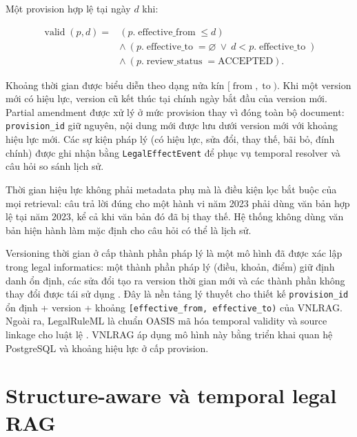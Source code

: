 \documentclass[a4paper,12pt]{extreport}
\newcommand{\code}[1]{\texttt{#1}}
\begin{document}
Một provision hợp lệ tại ngày $d$ khi:

\begin{equation}
\begin{aligned}
\operatorname{valid}(p,d)=
&\left(p.\operatorname{effective\_from}\le d\right)\\
&\land\ \left(p.\operatorname{effective\_to}=\varnothing\ \lor\ d<p.\operatorname{effective\_to}\right)\\
&\land\ \left(p.\operatorname{review\_status}=\text{ACCEPTED}\right).
\end{aligned}
\end{equation}

Khoảng thời gian được biểu diễn theo dạng nửa kín $[\operatorname{from},\operatorname{to})$. Khi một version mới có hiệu lực, version cũ kết thúc tại chính ngày bắt đầu của version mới. Partial amendment được xử lý ở mức provision thay vì đóng toàn bộ document: \code{provision\_id} giữ nguyên, nội dung mới được lưu dưới version mới với khoảng hiệu lực mới. Các sự kiện pháp lý (có hiệu lực, sửa đổi, thay thế, bãi bỏ, đính chính) được ghi nhận bằng \code{LegalEffectEvent} để phục vụ temporal resolver và câu hỏi so sánh lịch sử.

Thời gian hiệu lực không phải metadata phụ mà là điều kiện lọc bắt buộc của mọi retrieval: câu trả lời đúng cho một hành vi năm 2023 phải dùng văn bản hợp lệ tại năm 2023, kể cả khi văn bản đó đã bị thay thế. Hệ thống không dùng văn bản hiện hành làm mặc định cho câu hỏi có thể là lịch sử.

Versioning thời gian ở cấp thành phần pháp lý là một mô hình đã được xác lập trong legal informatics: một thành phần pháp lý (điều, khoản, điểm) giữ định danh ổn định, các sửa đổi tạo ra version thời gian mới và các thành phần không thay đổi được tái sử dụng \cite{demartim2025temporal}. Đây là nền tảng lý thuyết cho thiết kế \code{provision\_id} ổn định + version + khoảng \code{[effective\_from, effective\_to)} của VNLRAG. Ngoài ra, LegalRuleML là chuẩn OASIS mã hóa temporal validity và source linkage cho luật lệ \cite{legalruleml2021}. VNLRAG áp dụng mô hình này bằng triển khai quan hệ PostgreSQL và khoảng hiệu lực ở cấp provision.

\section{Structure-aware và temporal legal RAG}
\end{document}
